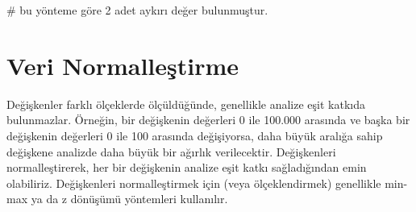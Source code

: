 \documentclass[
  letterpaper,
  DIV=11,
  numbers=noendperiod]{scrreprt}
\newenvironment{Shaded}{\begin{snugshade}}{\end{snugshade}}
\newcommand{\CommentTok}[1]{\textcolor[rgb]{0.37,0.37,0.37}{#1}}
\begin{document}
\begin{Shaded}
\begin{Highlighting}[]
\CommentTok{\# bu yönteme göre 2 adet aykırı değer bulunmuştur.}
\end{Highlighting}
\end{Shaded}

\section*{Veri Normalleştirme}\label{veri-normalleux15ftirme}


Değişkenler farklı ölçeklerde ölçüldüğünde, genellikle analize eşit
katkıda bulunmazlar. Örneğin, bir değişkenin değerleri 0 ile 100.000
arasında ve başka bir değişkenin değerleri 0 ile 100 arasında
değişiyorsa, daha büyük aralığa sahip değişkene analizde daha büyük bir
ağırlık verilecektir. Değişkenleri normalleştirerek, her bir değişkenin
analize eşit katkı sağladığından emin olabiliriz. Değişkenleri
normalleştirmek için (veya ölçeklendirmek) genellikle min-max ya da z
dönüşümü yöntemleri kullanılır.
\end{document}
